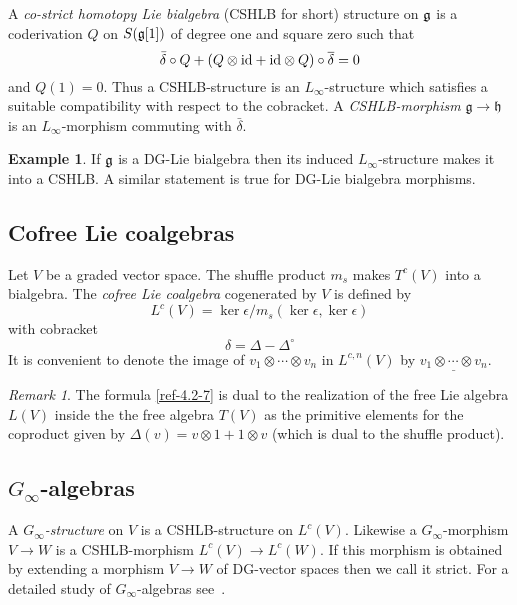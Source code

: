 \documentclass{amsart}
\numberwithin{equation}{section}
\theoremstyle{definition}
\newtheorem{example}[lemma]{Example}
\theoremstyle{remark}
\newtheorem{remarks}[lemmas]{Remark}
\begin{document}
A \emph{co-strict homotopy Lie bialgebra} (CSHLB for short) structure
on $\frak{g}$ is a coderivation $Q$ on $S(\frak{g}[1])$ of degree one
and square zero such that
\[
\bar{\delta}\circ Q+(Q\otimes{\rm
    id}+{\rm id}\otimes Q)\circ\overline{\delta}=0
\]
and $Q(1)=0$. Thus a CSHLB-structure is an $L_\infty$-structure which
satisfies a suitable compatibility with respect to the cobracket. 
A {\em CSHLB-morphism} $\mathfrak{g}\to\mathfrak{h}$ is an $L_\infty$-morphism 
commuting with $\bar{\delta}$. 
\begin{example} \label{ref-4.1-6} If $\frak{g}$ is a DG-Lie bialgebra then
  its induced $L_\infty$-structure makes it into a CSHLB. A similar
  statement is true for DG-Lie bialgebra morphisms.
\end{example}

\subsection{Cofree Lie coalgebras}

Let $V$ be a graded vector space. The shuffle product $m_s$ makes $T^c(V)$
into a bialgebra. The \emph{cofree Lie coalgebra} cogenerated by $V$
is defined by
\begin{equation}
\label{ref-4.2-7}
L^c(V)={\operatorname {ker}}\epsilon/m_s({\operatorname {ker}} \epsilon,{\operatorname {ker}}\epsilon)
\end{equation}
with cobracket
\[
\delta=\Delta-\Delta^\circ
\]
It is convenient to denote the image of $v_1\otimes\cdots \otimes v_n$
in $L^{c,n}(V)$ by $\underline{v_1\otimes\cdots \otimes v_n}$. 
\begin{remarks} The formula \eqref{ref-4.2-7} is dual to the realization
  of the free Lie algebra $L(V)$ inside the the free algebra $T(V)$ as
  the primitive elements for the coproduct given by
  $\Delta(v)=v\otimes 1+1\otimes v$ (which is dual to the shuffle
  product).
\end{remarks}

\subsection{$G_\infty$-algebras}
\label{ref-4.3-8}

A {\em $G_\infty$-structure} on $V$ is a CSHLB-structure on $L^c(V)$.
Likewise a $G_\infty$-morphism $V\rightarrow W$ is a CSHLB-morphism $L^c(V)\rightarrow
L^c(W)$. If this morphism is obtained by extending a morphism $V\rightarrow W$
of DG-vector spaces then we call it strict.
For a detailed study of $G_\infty$-algebras
see~\cite{gin}.
\end{document}
